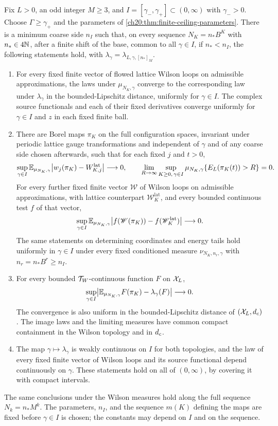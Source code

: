 \begin{theorem}\label{ch26:thm:positive-coupling-uniform-UV}
Fix $L>0$, an odd integer $M\ge3$, and $I=[\gamma_-,\gamma_+]\subset(0,\infty)$ with $\gamma_->0$. Choose $\Gamma\ge\gamma_+$ and the parameters of \cref{ch20:thm:finite-ceiling-parameters}. There is a minimum coarse side $n_I$ such that, on every sequence $N_K=n_*B^K$ with $n_*\in4\mathbb N$, after a finite shift of the base, common to all $\gamma\in I$, if $n_*<n_I$, the following statements hold, with $\lambda_\gamma=\lambda_{L,\gamma,[n_*]_M}$.
\begin{enumerate}
\item For every fixed finite vector of flowed lattice Wilson loops on admissible approximations, the laws under $\mu_{N_K,\gamma}$ converge to the corresponding law under $\lambda_\gamma$ in the bounded-Lipschitz distance, uniformly for $\gamma\in I$. The complex source functionals and each of their fixed derivatives converge uniformly for $\gamma\in I$ and $z$ in each fixed finite ball.
\item There are Borel maps $\pi_K$ on the full configuration spaces, invariant under periodic lattice gauge transformations and independent of $\gamma$ and of any coarse side chosen afterwards, such that for each fixed $j$ and $t>0$,
\[
 \sup_{\gamma\in I}\mathbb E_{\mu_{N_K,\gamma}}\bigl\lvert w_j(\pi_K)-W^{\mathrm{lat}}_{K,j}\bigr\rvert\longrightarrow0,\qquad
 \lim_{R\to\infty}\sup_{K\ge0,\,\gamma\in I}\mu_{N_K,\gamma}\{E_L(\pi_K(t))>R\}=0.
\]
For every further fixed finite vector $\mathscr W$ of Wilson loops on admissible approximations, with lattice counterpart $\mathscr W^{\mathrm{lat}}_K$, and every bounded continuous test $f$ of that vector,
\[
 \sup_{\gamma\in I}\mathbb E_{\mu_{N_K,\gamma}}\bigl\lvert f(\mathscr W(\pi_K))-f(\mathscr W^{\mathrm{lat}}_K)\bigr\rvert\longrightarrow0.
\]
The same statements on determining coordinates and energy tails hold uniformly in $\gamma\in I$ under every fixed conditioned measure $\nu_{N_K,n_r,\gamma}$ with $n_r=n_*B^r\ge n_I$.
\item For every bounded $\mathcal T_W$-continuous function $F$ on $\mathcal X_L$,
\[
 \sup_{\gamma\in I}\bigl\lvert\mathbb E_{\mu_{N_K,\gamma}}F(\pi_K)-\lambda_\gamma(F)\bigr\rvert\longrightarrow0.
\]
The convergence is also uniform in the bounded-Lipschitz distance of $(\mathcal X_L,d_c)$. The image laws and the limiting measures have common compact containment in the Wilson topology and in $d_c$.
\item The map $\gamma\mapsto\lambda_\gamma$ is weakly continuous on $I$ for both topologies, and the law of every fixed finite vector of Wilson loops and its source functional depend continuously on $\gamma$. These statements hold on all of $(0,\infty)$, by covering it with compact intervals.
\end{enumerate}
The same conclusions under the Wilson measures hold along the full sequence $N_k=n_*M^k$. The parameters, $n_I$, and the sequence $m(K)$ defining the maps are fixed before $\gamma\in I$ is chosen; the constants may depend on $I$ and on the sequence.
\end{theorem}

